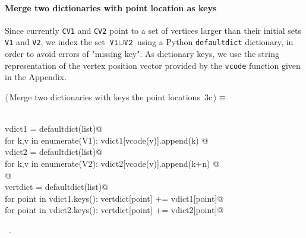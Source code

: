 \documentclass[11pt,oneside]{article}	%
\begin{document}
\paragraph{Merge two dictionaries with point location as keys}
Since currently \texttt{CV1} and \texttt{CV2} point to a set of vertices larger than their initial sets 
\texttt{V1} and \texttt{V2}, we index the set $\texttt{V1} \cup \texttt{V2}$ using a Python \texttt{defaultdict} dictionary, in order to avoid errors of "missing key". As dictionary keys, we use the string representation of the vertex position vector provided by the \texttt{vcode} function given in the Appendix.
\begin{flushleft} \small \label{scrap4}
\protect{}$\langle\,$Merge two dictionaries with keys the point locations\nobreak\ {\footnotesize 3c}$\,\rangle\equiv$
\vspace{-1ex}
\begin{list}{}{} \item
\mbox{}\verb@@\\
\mbox{}\verb@   vdict1 = defaultdict(list)@\\
\mbox{}\verb@   for k,v in enumerate(V1): vdict1[vcode(v)].append(k) @\\
\mbox{}\verb@   vdict2 = defaultdict(list)@\\
\mbox{}\verb@   for k,v in enumerate(V2): vdict2[vcode(v)].append(k+n) @\\
\mbox{}\verb@   @\\
\mbox{}\verb@   vertdict = defaultdict(list)@\\
\mbox{}\verb@   for point in vdict1.keys(): vertdict[point] += vdict1[point]@\\
\mbox{}\verb@   for point in vdict2.keys(): vertdict[point] += vdict2[point]@\\
\mbox{}\verb@@{\NWsep}
\end{list}
\vspace{-1ex}
\footnotesize\addtolength{\baselineskip}{-1ex}
\begin{list}{}{\setlength{\itemsep}{-\parsep}\setlength{\itemindent}{-\leftmargin}}
\item \NWtxtMacroRefIn\ .
\end{list}
\end{flushleft}
\end{document}
